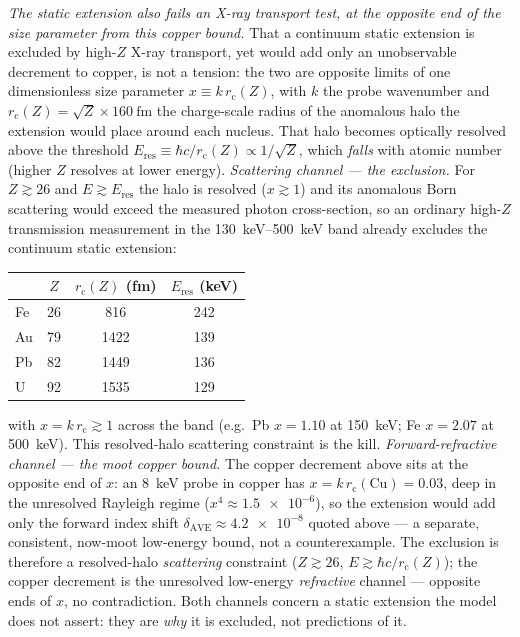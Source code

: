 \documentclass[aps,prd,twocolumn,superscriptaddress,nofootinbib,longbibliography]{revtex4-2}
\begin{document}
\emph{The static extension also fails an X-ray transport test, at the opposite end
of the size parameter from this copper bound.} That a continuum static extension is
excluded by high-$Z$ X-ray transport, yet would add only an unobservable decrement
to copper, is not a tension: the two are opposite limits of one dimensionless size
parameter $x\equiv k\,r_{\mathrm c}(Z)$, with $k$ the probe wavenumber and
$r_{\mathrm c}(Z)=\sqrt{Z}\times\SI{160}{\femto\meter}$ the charge-scale radius of
the anomalous halo the extension would place around each nucleus. That halo becomes
optically resolved above the threshold
$E_{\mathrm{res}}\equiv\hbar c/r_{\mathrm c}(Z)\propto 1/\sqrt{Z}$, which
\emph{falls} with atomic number (higher $Z$ resolves at lower energy).
\emph{Scattering channel --- the exclusion.} For $Z\gtrsim26$ and $E\gtrsim
E_{\mathrm{res}}$ the halo is resolved ($x\gtrsim1$) and its anomalous Born
scattering would exceed the measured photon cross-section, so an ordinary high-$Z$
transmission measurement in the \SIrange{130}{500}{\kilo\electronvolt} band already
excludes the continuum static extension:
\begin{center}
\begin{tabular}{lccc}
\toprule
 & $Z$ & $r_{\mathrm c}(Z)$ (fm) & $E_{\mathrm{res}}$ (keV) \\
\midrule
Fe & 26 & 816  & 242 \\
Au & 79 & 1422 & 139 \\
Pb & 82 & 1449 & 136 \\
U  & 92 & 1535 & 129 \\
\bottomrule
\end{tabular}
\end{center}
with $x=k\,r_{\mathrm c}\gtrsim1$ across the band (e.g.\ Pb $x=1.10$ at
\SI{150}{\kilo\electronvolt}; Fe $x=2.07$ at \SI{500}{\kilo\electronvolt}). This
resolved-halo scattering constraint is the kill.
\emph{Forward-refractive channel --- the moot copper bound.} The copper decrement
above sits at the opposite end of $x$: an \SI{8}{\kilo\electronvolt} probe in copper
has $x=k\,r_{\mathrm c}(\mathrm{Cu})=0.03$, deep in the unresolved Rayleigh regime
($x^4\approx\num{1.5e-6}$), so the extension would add only the forward index shift
$\delta_{\mathrm{AVE}}\approx\num{4.2e-8}$ quoted above --- a separate, consistent,
now-moot low-energy bound, not a counterexample. The exclusion is therefore a
resolved-halo \emph{scattering} constraint ($Z\gtrsim26$,
$E\gtrsim\hbar c/r_{\mathrm c}(Z)$); the copper decrement is the unresolved
low-energy \emph{refractive} channel --- opposite ends of $x$, no contradiction.
Both channels concern a static extension the model does not assert: they are
\emph{why} it is excluded, not predictions of it.
\end{document}
